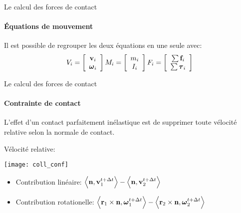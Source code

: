 \begin{frame}{Le calcul des forces de contact}
    \framesubtitle{Équations de mouvement}
    Il est possible de regrouper les deux équations en une seule avec:
    \[
        V_i = \left[ \begin{array}{c} {\bf v}_i\\\boldsymbol\omega_i\end{array}\right]
        M_i = \left[ \begin{array}{c} m_i\\I_i\end{array}\right]
        F_i = \left[ \begin{array}{c} \sum {\bf f}_i\\\sum \boldsymbol\tau_i\end{array}\right]
    \]
    \pause
    \begin{center}
    \end{center}
\end{frame}

\begin{frame}{Le calcul des forces de contact}
    \framesubtitle{Contrainte de contact}
    L’effet d’un contact parfaitement inélastique est de supprimer toute
    vélocité relative selon la normale de contact.
    \begin{description}
        \item[Vélocité relative:]
    \end{description}
    \pause
    \begin{center}
        \texttt{[image: coll\_conf]}
    \end{center}
    \pause
    \begin{itemize}
        \item Contribution linéaire:
            $
                \left< {\bf n}, {\bf v}_1^{t + \Delta t} \right> -
                \left< {\bf n}, {\bf v}_2^{t + \Delta t} \right>
            $
            \pause
        \item Contribution rotationelle:
            $
                \left<{\bf r}_1 \times {\bf n}, \boldsymbol\omega_1^{t + \Delta t} \right> -
                \left<{\bf r}_2 \times {\bf n}, \boldsymbol\omega_2^{t + \Delta t} \right>
            $
    \end{itemize}
\end{frame}

